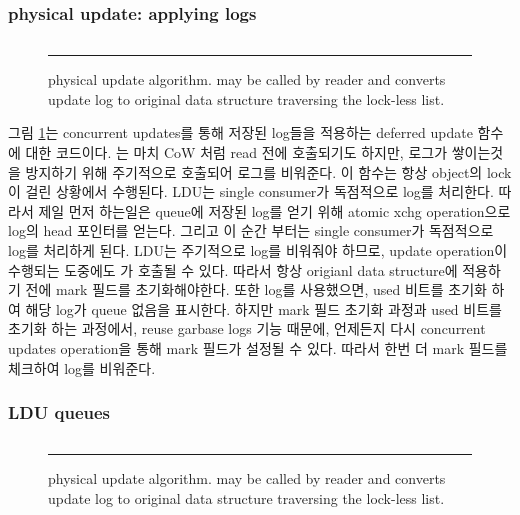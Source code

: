 \fi


\subsubsection{physical update: applying logs}


\begin{figure}[tb!]
\inputminted[linenos,fontsize=\footnotesize, tabsize=2]{c}{src/ldu_physical.c}
\rule{\columnwidth}{0.5pt}
\vspace{-\baselineskip}
\caption{ physical update algorithm.  may be
 called by reader and converts update log to original data structure
 traversing the lock-less list.}
\label{fig:glduphysicalupdate}
\end{figure}

\ifkor
그림 \ref{fig:glduphysicalupdate}는 concurrent updates를 통해 저장된 log들을 적용하는 deferred
update 함수에 대한 코드이다.
는 마치 CoW 처럼 read 전에 호출되기도 하지만, 로그가 쌓이는것을 방지하기 위해 주기적으로
호출되어 로그를 비워준다.
이 함수는 항상 object의 lock이 걸린 상황에서 수행된다. 
LDU는 single consumer가 독점적으로 log를 처리한다.
따라서 제일 먼저 하는일은 queue에 저장된 log를 얻기 위해 atomic xchg operation으로 log의 head 포인터를
얻는다.
그리고 이 순간 부터는 single consumer가 독점적으로 log를 처리하게 된다.
LDU는 주기적으로 log를 비워줘야 하므로, update operation이 수행되는 도중에도 가
호출될 수 있다.
따라서 항상 origianl data structure에 적용하기 전에 mark 필드를 초기화해야한다.
또한 log를 사용했으면, used 비트를 초기화 하여 해당 log가 queue 없음을 표시한다.
하지만 mark 필드 초기화 과정과 used 비트를 초기화 하는 과정에서, reuse garbase logs 기능 때문에,
언제든지 다시 concurrent updates operation을 통해 mark 필드가 설정될 수 있다.
따라서 한번 더 mark 필드를 체크하여 log를 비워준다.
\else

\fi

\subsubsection{LDU queues}
\begin{figure}[tb!]
\inputminted[linenos,fontsize=\footnotesize, tabsize=2]{c}{src/ldu_queue.c}
\rule{\columnwidth}{0.5pt}
\vspace{-\baselineskip}
\caption{ physical update algorithm.  may be
 called by reader and converts update log to original data structure
 traversing the lock-less list.}
\label{fig:lduqueue}
\end{figure}

